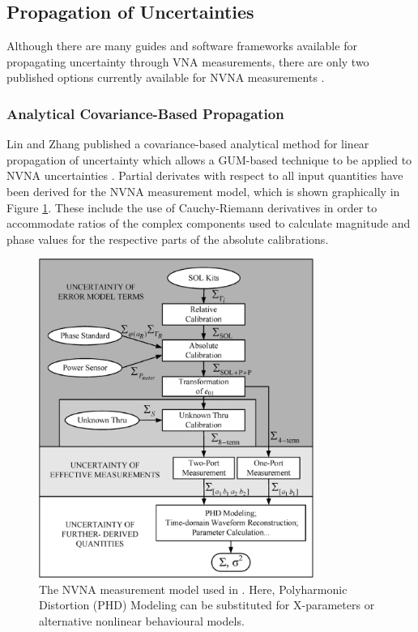 \documentclass[../thesis/thesis.tex]{subfiles}
\begin{document}
\subsection{Propagation of Uncertainties}

Although there are many guides and software frameworks available for propagating uncertainty through VNA measurements, there are only two published options currently available for NVNA measurements \cite{Lin_2012, MUFWebsite}.

\subsubsection{Analytical Covariance-Based Propagation}

Lin and Zhang published a covariance-based analytical method for linear propagation of uncertainty which allows a GUM-based technique to be applied to NVNA uncertainties \cite{Lin_2012}. Partial derivates with respect to all input quantities have been derived for the NVNA measurement model, which is shown graphically in Figure \ref{ch4_fig_linmodel}. These include the use of Cauchy-Riemann derivatives in order to accommodate ratios of the complex components used to calculate magnitude and phase values for the respective parts of the absolute calibrations.

\begin{figure}
	\centering
	\includegraphics[width=0.8\textwidth]{linmodel.png}
	\caption{The NVNA measurement model used in \cite{Lin_2012}. Here, Polyharmonic Distortion (PHD) Modeling can be substituted for X-parameters or alternative nonlinear behavioural models.}
	\label{ch4_fig_linmodel}
\end{figure}
\end{document}
